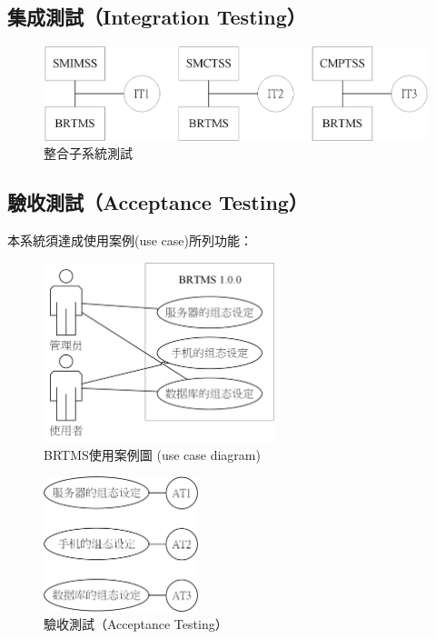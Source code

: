  		\subsection{集成測試（Integration Testing）}
 			\begin{figure}[htbp]
				\centering
				\includegraphics[width = 1\textwidth]{IntegrationTesting.png}
				\caption{整合子系統測試}\label{IntegrationTesting}
			\end{figure}

		\subsection{驗收測試（Acceptance Testing）}
		本系統須達成使用案例(use case)所列功能：
			\begin{figure}[htbp]
				\centering
				\includegraphics[width = 0.6\textwidth]{usecasediagram.png}
				\caption{BRTMS使用案例圖 (use case diagram)}\label{usecasediagram}
			\end{figure}
			\begin{figure}[htbp]
				\centering
				\includegraphics[width = 0.4\textwidth]{AcceptanceTesting.png}
				\caption{驗收測試（Acceptance Testing）}\label{AcceptanceTesting}
			\end{figure}

